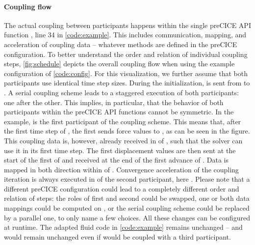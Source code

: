 \paragraph{Coupling flow} The actual coupling between participants happens within the single preCICE API function , line 34 in \autoref{code:example}. This includes communication, mapping, and acceleration of coupling data -- whatever methods are defined in the preCICE configuration. To better understand the order and relation of individual coupling steps, \autoref{fig:schedule} depicts the overall coupling flow when using the example configuration of \autoref{code:config}.
For this visualization, we further assume that both participants use identical time step sizes.
During the initialization,  is sent from  to . 
A serial coupling scheme leads to a staggered execution of both participants: one after the other. This implies, in particular, that the behavior of both participants within the preCICE API functions cannot be symmetric.
In the example,  is the first participant of the coupling scheme. 
This means that, after the first time step of , the first  sends force values to , as can be seen in the figure. This coupling data is, however, already received in  of , such that the solver can use it in its first time step. The first displacement values are then sent at the start of the first  of  and received at the end of the first advance of .  
Data is mapped in both direction within  of . Convergence acceleration of the coupling iteration is always executed in  of the second participant, here .
Please note that a different preCICE configuration could lead to a completely different order and relation of steps: the roles of first and second could be swapped, one or both data mappings could be computed on , or the serial coupling scheme could be replaced by a parallel one, to only name a few choices. All these changes can be configured at runtime. The adapted fluid code in \autoref{code:example} remains unchanged -- and would remain unchanged even if  would be coupled with a third participant. 


